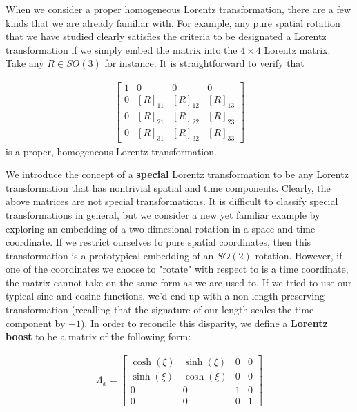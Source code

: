 When we consider a proper homogeneous Lorentz transformation, there are a few kinds that we are already familiar with. For example, any pure spatial rotation that we have studied clearly satisfies the criteria to be designated a Lorentz transformation if we simply embed the matrix into the $4\times 4$ Lorentz matrix. Take any $R\in SO(3)$ for instance. It is straightforward to verify that 

\begin{equation}
\begin{aligned}
\begin{bmatrix}
	1&0&0&0\\
	0&[R]_{11}&[R]_{12}&[R]_{13}\\
	0&[R]_{21}&[R]_{22}&[R]_{23}\\
	0&[R]_{31}&[R]_{32}&[R]_{33}
\end{bmatrix}
\end{aligned}
\end{equation}
is a proper, homogeneous Lorentz transformation.

We introduce the concept of a \textbf{special} Lorentz transformation to be any Lorentz transformation that has nontrivial spatial and time components. Clearly, the above matrices are not special transformations. It is difficult to classify special transformations in general, but we consider a new yet familiar example by exploring an embedding of a two-dimesional rotation in a space and time coordinate. If we restrict ourselves to pure spatial coordinates, then this transformation is a prototypical embedding of an $SO(2)$ rotation. However, if one of the coordinates we choose to "rotate" with respect to is a time coordinate, the matrix cannot take on the same form as we are used to. If we tried to use our typical sine and cosine functions, we'd end up with a non-length preserving transformation (recalling that the signature of our length scales the time component by $-1$). In order to reconcile this disparity, we define a \textbf{Lorentz boost} to be a matrix of the following form:

\begin{equation}
\begin{aligned}
	\Lambda_x = \begin{bmatrix}
						\cosh(\xi) & \sinh(\xi) & 0 & 0 \\
						\sinh(\xi) & \cosh(\xi) & 0 & 0 \\
						0&0&1&0\\
						0&0&0&1
					\end{bmatrix}
\end{aligned}
\end{equation}

